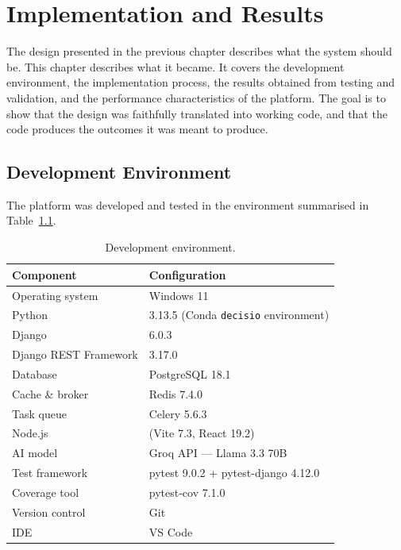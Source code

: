 
\chapter{Implementation and Results}

\noindent
The design presented in the previous chapter describes
what the system should be.
This chapter describes what it became.
It covers the development environment,
the implementation process,
the results obtained from testing and validation,
and the performance characteristics of the platform.
The goal is to show that the design was faithfully
translated into working code, and that the code
produces the outcomes it was meant to produce.


\section{Development Environment}

\noindent
The platform was developed and tested
in the environment summarised in Table~\ref{tab:env}.

\begin{table}[h!]
\centering
\caption{Development environment.}
\label{tab:env}
\renewcommand{\arraystretch}{1.3}
\begin{tabular}{|l|l|}
\hline
\textbf{Component} & \textbf{Configuration} \\
\hline
Operating system   & Windows 11 \\
Python             & 3.13.5 (Conda \texttt{decisio} environment) \\
Django             & 6.0.3 \\
Django REST Framework & 3.17.0 \\
Database           & PostgreSQL 18.1 \\
Cache \& broker    & Redis 7.4.0 \\
Task queue         & Celery 5.6.3 \\
Node.js            & (Vite 7.3, React 19.2) \\
AI model           & Groq API — Llama 3.3 70B \\
Test framework     & pytest 9.0.2 + pytest-django 4.12.0 \\
Coverage tool      & pytest-cov 7.1.0 \\
Version control    & Git \\
IDE                & VS Code \\
\hline
\end{tabular}
\end{table}


